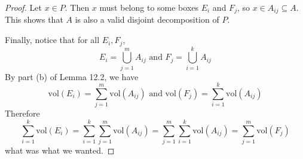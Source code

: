 \documentclass{article}
\theoremstyle{plain} %
\numberwithin{thm}{section} %
\theoremstyle{definition}
\begin{document}
\begin{proof}
        Let \(x \in P\). Then \(x\) must belong to some boxes \(E_i\) and \(F_j\), so \(x \in A_{ij} \subseteq A\). This shows that \(A\) is also a valid disjoint decomposition of \(P\).

        Finally, notice that for all \(E_i, F_j\),
        \[
            E_i = \bigcup_{j=1}^{m} A_{ij} \text{ and } F_j = \bigcup_{i=1}^{k} A_{ij}
        \]
        By part (b) of Lemma 12.2, we have
        \[
            \mathrm{vol} (E_i) = \sum_{j=1}^m \mathrm{vol} (A_{ij}) \text{ and } \mathrm{vol} (F_j) = \sum_{i=1}^{k} \mathrm{vol} (A_{ij})
        \]
        Therefore
        \[
            \sum_{i=1}^{k} \mathrm{vol} (E_i) = \sum_{i=1}^{k} \sum_{j=1}^{m} \mathrm{vol} (A_{ij}) = \sum_{j=1}^{m} \sum_{i=1}^{k} \mathrm{vol} (A_{ij}) = \sum_{j=1}^{m} \mathrm{vol} (F_j)
        \]
        what was what we wanted.
        \smallbreak
    \end{proof}
\end{document}
